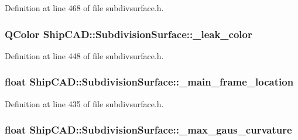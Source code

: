 Definition at line 468 of file subdivsurface.\+h.

\subsubsection[{\texorpdfstring{\+\_\+leak\+\_\+color}{_leak_color}}]{\setlength{\rightskip}{0pt plus 5cm}Q\+Color Ship\+C\+A\+D\+::\+Subdivision\+Surface\+::\+\_\+leak\+\_\+color\hspace{0.3cm}{\ttfamily [protected]}}\hypertarget{classShipCAD_1_1SubdivisionSurface_aacd1616b97a4425cc9b1051e01785596}{}\label{classShipCAD_1_1SubdivisionSurface_aacd1616b97a4425cc9b1051e01785596}


Definition at line 448 of file subdivsurface.\+h.

\subsubsection[{\texorpdfstring{\+\_\+main\+\_\+frame\+\_\+location}{_main_frame_location}}]{\setlength{\rightskip}{0pt plus 5cm}float Ship\+C\+A\+D\+::\+Subdivision\+Surface\+::\+\_\+main\+\_\+frame\+\_\+location\hspace{0.3cm}{\ttfamily [protected]}}\hypertarget{classShipCAD_1_1SubdivisionSurface_a3ea08aa45ad221a1b485010ce5e8dee7}{}\label{classShipCAD_1_1SubdivisionSurface_a3ea08aa45ad221a1b485010ce5e8dee7}


Definition at line 435 of file subdivsurface.\+h.

\subsubsection[{\texorpdfstring{\+\_\+max\+\_\+gaus\+\_\+curvature}{_max_gaus_curvature}}]{\setlength{\rightskip}{0pt plus 5cm}float Ship\+C\+A\+D\+::\+Subdivision\+Surface\+::\+\_\+max\+\_\+gaus\+\_\+curvature\hspace{0.3cm}{\ttfamily [protected]}}\hypertarget{classShipCAD_1_1SubdivisionSurface_a1658374385131656d359ff373d2cb08c}{}\label{classShipCAD_1_1SubdivisionSurface_a1658374385131656d359ff373d2cb08c}


